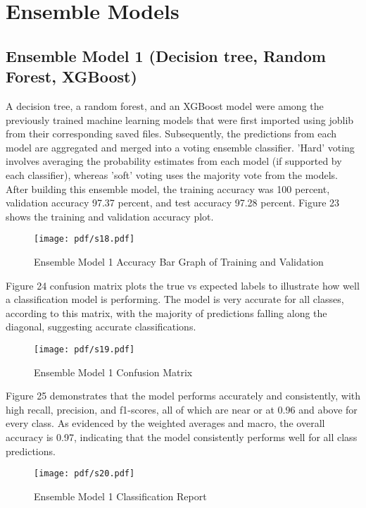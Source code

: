 \section{Ensemble Models}

\subsection {Ensemble Model 1 (Decision tree, Random Forest, XGBoost)}
A decision tree, a random forest, and an XGBoost model were among the previously trained machine learning models that were first imported using joblib from their corresponding saved files. Subsequently, the predictions from each model are aggregated and merged into a voting ensemble classifier. 'Hard' voting involves averaging the probability estimates from each model (if supported by each classifier), whereas 'soft' voting uses the majority vote from the models. After building this ensemble model, the training accuracy was 100 percent, validation accuracy 97.37 percent, and test accuracy 97.28 percent. Figure 23 shows the training and validation accuracy plot.
\begin{figure}[ht!]
  \raggedright
  \texttt{[image: pdf/s18.pdf]}
  \vspace{0pt}
  \caption{\textbf{ }Ensemble Model 1 Accuracy Bar Graph of Training and Validation}
\end{figure}

Figure 24 confusion matrix plots the true vs expected labels to illustrate how well a classification model is performing. The model is very accurate for all classes, according to this matrix, with the majority of predictions falling along the diagonal, suggesting accurate classifications.
\begin{figure}[ht!]
  \raggedright
  \texttt{[image: pdf/s19.pdf]}
  \vspace{0pt}
  \caption{\textbf{ }Ensemble Model 1 Confusion Matrix}
\end{figure}

Figure 25 demonstrates that the model performs accurately and consistently, with high recall, precision, and f1-scores, all of which are near or at 0.96 and above for every class. As evidenced by the weighted averages and macro, the overall accuracy is 0.97, indicating that the model consistently performs well for all class predictions.

\begin{figure}[ht!]
  \raggedright
  \texttt{[image: pdf/s20.pdf]}
  \vspace{0pt}
  \caption{\textbf{ }Ensemble Model 1 Classification Report}
\end{figure}

